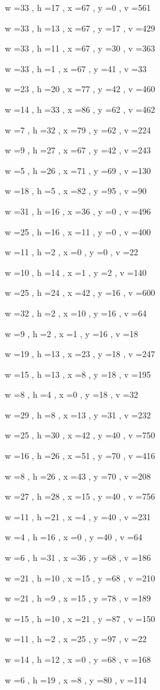 \documentclass[11pt]{article}
\begin{document}
w =33 , h =17 , x =67 , y =0 , v =561
\par
w =33 , h =13 , x =67 , y =17 , v =429
\par
w =33 , h =11 , x =67 , y =30 , v =363
\par
w =33 , h =1 , x =67 , y =41 , v =33
\par
w =23 , h =20 , x =77 , y =42 , v =460
\par
w =14 , h =33 , x =86 , y =62 , v =462
\par
w =7 , h =32 , x =79 , y =62 , v =224
\par
w =9 , h =27 , x =67 , y =42 , v =243
\par
w =5 , h =26 , x =71 , y =69 , v =130
\par
w =18 , h =5 , x =82 , y =95 , v =90
\par
w =31 , h =16 , x =36 , y =0 , v =496
\par
w =25 , h =16 , x =11 , y =0 , v =400
\par
w =11 , h =2 , x =0 , y =0 , v =22
\par
w =10 , h =14 , x =1 , y =2 , v =140
\par
w =25 , h =24 , x =42 , y =16 , v =600
\par
w =32 , h =2 , x =10 , y =16 , v =64
\par
w =9 , h =2 , x =1 , y =16 , v =18
\par
w =19 , h =13 , x =23 , y =18 , v =247
\par
w =15 , h =13 , x =8 , y =18 , v =195
\par
w =8 , h =4 , x =0 , y =18 , v =32
\par
w =29 , h =8 , x =13 , y =31 , v =232
\par
w =25 , h =30 , x =42 , y =40 , v =750
\par
w =16 , h =26 , x =51 , y =70 , v =416
\par
w =8 , h =26 , x =43 , y =70 , v =208
\par
w =27 , h =28 , x =15 , y =40 , v =756
\par
w =11 , h =21 , x =4 , y =40 , v =231
\par
w =4 , h =16 , x =0 , y =40 , v =64
\par
w =6 , h =31 , x =36 , y =68 , v =186
\par
w =21 , h =10 , x =15 , y =68 , v =210
\par
w =21 , h =9 , x =15 , y =78 , v =189
\par
w =15 , h =10 , x =21 , y =87 , v =150
\par
w =11 , h =2 , x =25 , y =97 , v =22
\par
w =14 , h =12 , x =0 , y =68 , v =168
\par
w =6 , h =19 , x =8 , y =80 , v =114
\par
\newpage
\end{document}
